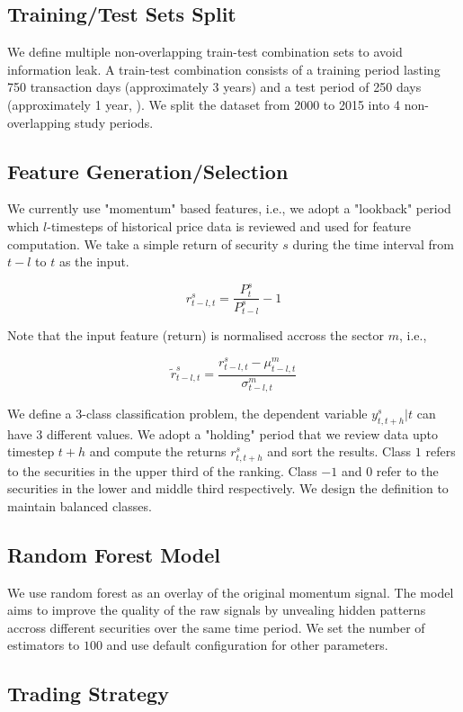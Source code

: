 \documentclass[12pt]{article}
\begin{document}
\subsection{Training/Test Sets Split}

We define multiple non-overlapping train-test combination sets to avoid information leak. A train-test combination consists of a training period lasting 750 transaction days (approximately 3 years) and a test period of 250 days (approximately 1 year, \cite{Fischer2017Deep}). We split the dataset from 2000 to 2015 into 4 non-overlapping study periods.

\subsection{Feature Generation/Selection}

We currently use "momentum" based features, i.e., we adopt a "lookback" period which $l$-timesteps of historical price data is reviewed and used for feature computation. We take a simple return of security $s$ during the time interval from $t-l$ to $t$ as the input.

$$r_{t-l, t}^s = \frac{P_t^s}{P_{t-l}^s}-1$$

Note that the input feature (return) is normalised accross the sector $m$, i.e.,

$$\tilde{r}_{t-l, t}^s = \frac{r_{t-l, t}^s-\mu_{t-l, t}^m}{\sigma_{t-l, t}^m}$$

We define a 3-class classification problem, the dependent variable $y_{t, t+h}^s|t$ can have 3 different values. We adopt a "holding" period that we review data upto timestep $t+h$ and compute the returns $r_{t, t+h}^s$ and sort the results. Class $1$ refers to the securities in the upper third of the ranking. Class $-1$ and $0$ refer to the securities in the lower and middle third respectively. We design the definition to maintain balanced classes.

\subsection{Random Forest Model}

We use random forest as an overlay of the original momentum signal. The model aims to improve the quality of the raw signals by unvealing hidden patterns accross different securities over the same time period. We set the number of estimators to $100$ and use default configuration for other parameters.

\subsection{Trading Strategy}
\end{document}
